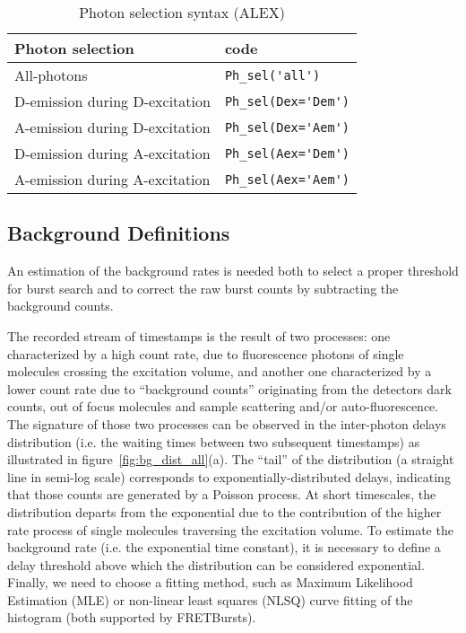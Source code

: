 \begin{table}
\begin{tabular}{l|l}
  Photon selection  & code \\
  \hline
  All-photons & \verb|Ph_sel('all')|\\
  D-emission during D-excitation & \verb|Ph_sel(Dex='Dem')|\\
  A-emission during D-excitation & \verb|Ph_sel(Dex='Aem')|\\
  D-emission during A-excitation & \verb|Ph_sel(Aex='Dem')|\\
  A-emission during A-excitation & \verb|Ph_sel(Aex='Aem')|\\
\end{tabular}
\caption{\label{tab:ph_sel_alex}Photon selection syntax (ALEX)}
\end{table}

\subsection{Background Definitions}
\label{sec:bg_intro}

An estimation of the background rates is needed both to select a proper threshold for
burst search and to correct the raw burst counts by subtracting the background counts.

The recorded stream of timestamps is the result of two processes: one characterized
by a high count rate, due to fluorescence photons of single molecules crossing the
excitation volume, and another one characterized by a lower count rate due to “background
counts” originating from the detectors dark counts, out of focus molecules
and sample scattering and/or auto-fluorescence\cite{Gopich_2008}.
The signature of those two processes can be
observed in the inter-photon delays distribution (i.e. the waiting times
between two subsequent timestamps) as illustrated in figure~\ref{fig:bg_dist_all}(a).
The “tail” of the distribution (a straight line in semi-log scale) corresponds
to exponentially-distributed delays, indicating that those counts are generated by a
Poisson process. At short
timescales, the distribution departs from the exponential due to the contribution
of the higher rate process of single molecules traversing the excitation volume.
To estimate the background rate (i.e. the exponential time constant),
it is necessary to define a delay threshold above which the distribution
can be considered exponential.
Finally, we need to choose a fitting method, such as Maximum
Likelihood Estimation (MLE) or non-linear least squares (NLSQ) curve fitting of 
the histogram (both supported by FRETBursts).


